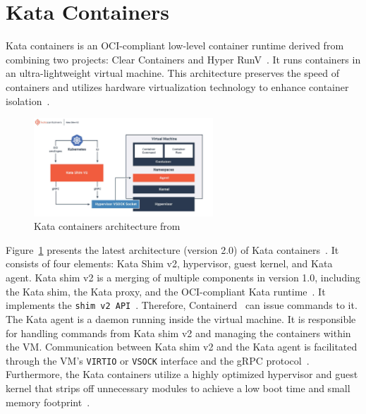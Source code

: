 \section{Kata Containers}
\label{sec:Kata}

Kata containers is an OCI-compliant low-level container runtime derived from combining two projects: Clear Containers and Hyper RunV~\cite*{Kata-Containers}. It runs containers in an ultra-lightweight virtual machine. This architecture preserves the speed of containers and utilizes 
hardware virtualization technology to enhance container isolation~\cite*{Kata-Containers}.
\begin{figure}[htp]
  \centering
  \includegraphics[width=0.6\textwidth]{images/kata.PNG}
  \caption[Kata containers architecture]{Kata containers architecture from~\cite*{Kata-Containers} }
  \label{fig:kata}
\end{figure}
Figure~\ref{fig:kata} presents the latest architecture (version 2.0) of Kata containers~\cite*{Kata_arch}. It consists of four elements: Kata Shim v2, hypervisor, guest kernel, and Kata agent. Kata shim v2 is a merging of multiple components in version 1.0, including the Kata shim, 
the Kata proxy, and the OCI-compliant Kata runtime~\cite*{Kata_arch}. It implements the \texttt{shim v2 API}~\cite*{shim_v2}. Therefore, Containerd~\cite*{containerd} can issue commands to it.  The Kata agent is a daemon running inside the virtual machine. It is responsible for handling commands 
from Kata shim v2 and managing the containers within the VM. Communication between Kata shim v2 and the Kata agent is facilitated through the VM's \texttt{VIRTIO} or \texttt{VSOCK} interface and the gRPC protocol~\cite*{Kata_arch}. Furthermore, the 
Kata containers utilize a highly optimized hypervisor and guest kernel that strips off unnecessary modules to achieve a low boot time and small memory footprint~\cite*{8939164}.


